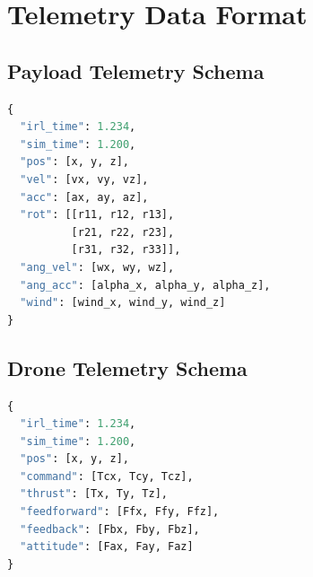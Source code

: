 \documentclass[12pt,a4paper]{article}
\begin{document}
\newpage
\section{Telemetry Data Format}
\label{app:telemetry}

\subsection{Payload Telemetry Schema}

\begin{lstlisting}[language=python]
{
  "irl_time": 1.234,
  "sim_time": 1.200,
  "pos": [x, y, z],
  "vel": [vx, vy, vz],
  "acc": [ax, ay, az],
  "rot": [[r11, r12, r13],
          [r21, r22, r23],
          [r31, r32, r33]],
  "ang_vel": [wx, wy, wz],
  "ang_acc": [alpha_x, alpha_y, alpha_z],
  "wind": [wind_x, wind_y, wind_z]
}
\end{lstlisting}

\subsection{Drone Telemetry Schema}

\begin{lstlisting}[language=python]
{
  "irl_time": 1.234,
  "sim_time": 1.200,
  "pos": [x, y, z],
  "command": [Tcx, Tcy, Tcz],
  "thrust": [Tx, Ty, Tz],
  "feedforward": [Ffx, Ffy, Ffz],
  "feedback": [Fbx, Fby, Fbz],
  "attitude": [Fax, Fay, Faz]
}
\end{lstlisting}
\end{document}

